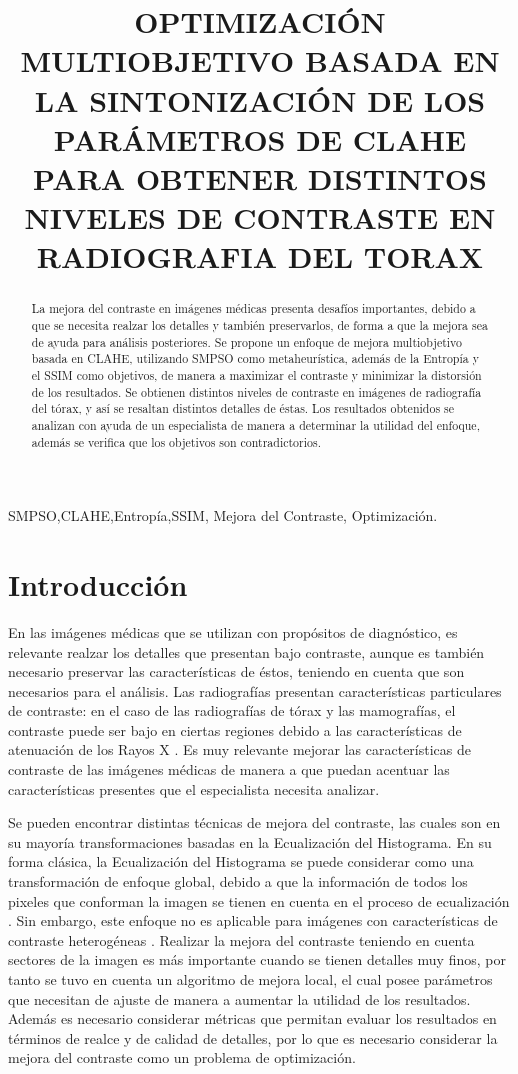 \documentclass[spanish,twocolumn]{article}
\title{OPTIMIZACIÓN MULTIOBJETIVO BASADA EN LA SINTONIZACIÓN DE LOS PARÁMETROS DE CLAHE PARA OBTENER DISTINTOS NIVELES DE CONTRASTE EN RADIOGRAFIA DEL TORAX}
\begin{document}
%
\maketitle
%
\begin{abstract}
La mejora del contraste en imágenes médicas presenta desafíos importantes, debido a que se necesita realzar los detalles y también preservarlos, de forma a que la mejora sea de ayuda para análisis posteriores. Se propone un enfoque de mejora multiobjetivo basada en CLAHE, utilizando SMPSO como metaheurística, además de la Entropía y el SSIM como objetivos, de manera a maximizar el contraste y minimizar la distorsión de los resultados. Se obtienen distintos niveles de contraste en imágenes de radiografía del tórax, y así se resaltan distintos detalles de éstas. Los resultados obtenidos se analizan con ayuda de un especialista de manera a determinar la utilidad del enfoque, además se verifica que los objetivos son contradictorios.
\end{abstract}
%
\begin{keywords}
SMPSO,CLAHE,Entropía,SSIM, Mejora del Contraste, Optimización.
\end{keywords}
%
\section{Introducción}
\label{sec:intro}

En las imágenes médicas que se utilizan con propósitos de diagnóstico, es relevante realzar los detalles que presentan bajo contraste, aunque es también necesario preservar las características de éstos, teniendo en cuenta que son necesarios para el análisis. Las radiografías presentan características particulares de contraste: en el caso de las radiografías de tórax y las mamografías, el contraste puede ser bajo en ciertas regiones debido a las características de atenuación de los Rayos X \cite{chang1998image}. Es muy relevante mejorar las características de contraste de las imágenes médicas de manera a que puedan acentuar las características presentes que el especialista necesita analizar.

Se pueden encontrar distintas técnicas de mejora del contraste, las cuales son en su mayoría transformaciones basadas en la Ecualización del Histograma\cite{russ2010image,841534}. En su forma clásica, la Ecualización del Histograma se puede considerar como una transformación de enfoque global, debido a que la información de todos los pixeles que conforman la imagen se tienen en cuenta en el proceso de ecualización \cite{1419470}. Sin embargo, este enfoque no es aplicable para imágenes con características de contraste heterogéneas \cite{841534}. Realizar la mejora del contraste teniendo en cuenta sectores de la imagen es más importante cuando se tienen detalles muy finos, por tanto se tuvo en cuenta un algoritmo de mejora local, el cual posee parámetros que necesitan de ajuste de manera a aumentar la utilidad de los resultados. Además es necesario considerar métricas que permitan evaluar los resultados en términos de realce y de calidad de detalles, por lo que es necesario considerar la mejora del contraste como un problema de optimización.
\end{document}

